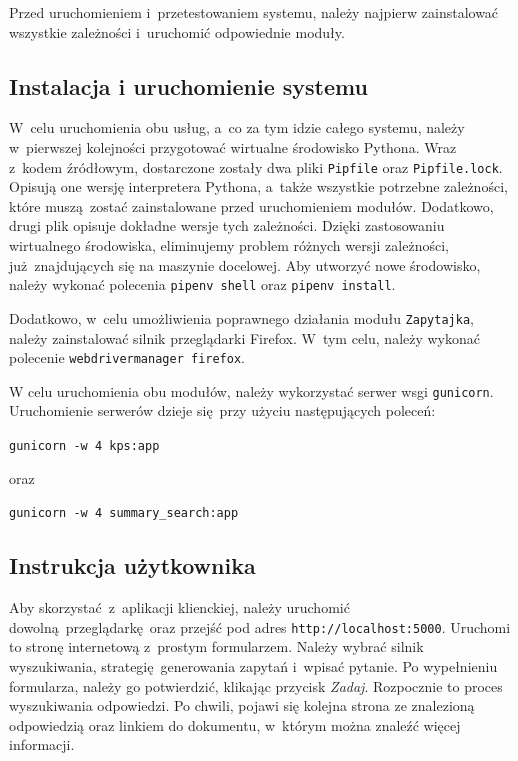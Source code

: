 Przed uruchomieniem i~przetestowaniem systemu, należy najpierw zainstalować wszystkie zależności i~uruchomić odpowiednie moduły.

\subsection{Instalacja i uruchomienie systemu}
W~celu uruchomienia obu usług, a~co za tym idzie całego systemu, należy w~pierwszej kolejności przygotować wirtualne środowisko Pythona. Wraz z~kodem źródłowym, dostarczone zostały dwa pliki \texttt{Pipfile} oraz \texttt{Pipfile.lock}. Opisują one wersję interpretera Pythona, a~także wszystkie potrzebne zależności, które muszą zostać zainstalowane przed uruchomieniem modułów. Dodatkowo, drugi plik opisuje dokładne wersje tych zależności. Dzięki zastosowaniu wirtualnego środowiska, eliminujemy problem różnych wersji zależności, już znajdujących się na maszynie docelowej. Aby utworzyć nowe środowisko, należy wykonać polecenia \texttt{pipenv~shell} oraz \texttt{pipenv~install}.

Dodatkowo, w~celu umożliwienia poprawnego działania modułu \texttt{Zapytajka}, należy zainstalować silnik przeglądarki Firefox. W~tym celu, należy wykonać polecenie \texttt{webdrivermanager firefox}.

W celu uruchomienia obu modułów, należy wykorzystać serwer wsgi \texttt{gunicorn}. Uruchomienie serwerów dzieje się przy użyciu następujących poleceń:
\begin{center}
    \texttt{gunicorn -w 4 kps:app}
\end{center}
oraz 
\begin{center}
    \texttt{gunicorn -w 4 summary\_{}search:app}
\end{center}

\subsection{Instrukcja użytkownika}
Aby skorzystać z~aplikacji klienckiej, należy uruchomić dowolną przeglądarkę oraz przejść pod adres \texttt{http://localhost:5000}. Uruchomi to stronę internetową z~prostym formularzem. Należy wybrać silnik wyszukiwania, strategię generowania zapytań i~wpisać pytanie. Po wypełnieniu formularza, należy go potwierdzić, klikając przycisk \textit{Zadaj}. Rozpocznie to proces wyszukiwania odpowiedzi. Po chwili, pojawi się kolejna strona ze znalezioną odpowiedzią oraz linkiem do dokumentu, w~którym można znaleźć więcej informacji.

